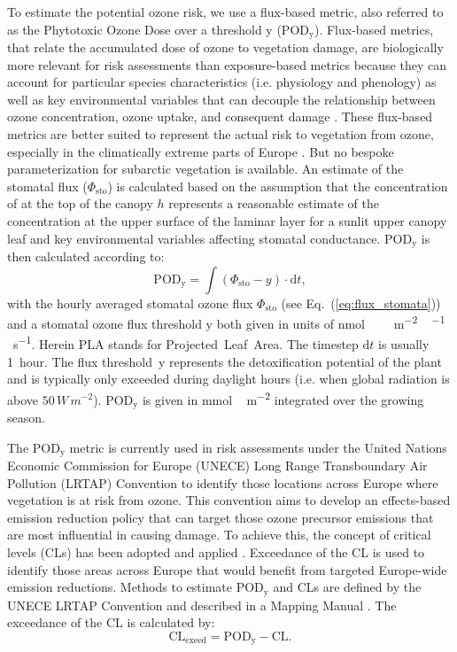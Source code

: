 \documentclass[bg, manuscript]{copernicus}
\begin{document}
To estimate the potential ozone risk, we use a flux-based metric, also referred to as the Phytotoxic Ozone Dose over a threshold y ($\mathrm{POD_y}$). Flux-based metrics, that relate the accumulated dose of ozone to vegetation damage, are biologically more relevant for risk assessments than exposure-based metrics because they can account for particular species characteristics (i.e. physiology and phenology) as well as key environmental variables that can decouple the relationship between ozone concentration, ozone uptake, and consequent damage \citep{PT:Emberson2020}. These flux-based metrics are better suited to represent the actual risk to vegetation from ozone, especially in the climatically extreme parts of Europe \citep{EP:Simpson2007,GCB:Mills2011,ICP:MappingManual2017}. But no bespoke parameterization for subarctic vegetation is available.
An estimate of the stomatal  flux ($\Phi_\mathrm{sto}$) is calculated based on the assumption that the concentration of  at the top of the canopy $h$ represents a reasonable estimate of the concentration at the upper surface of the laminar layer for a sunlit upper canopy leaf and key environmental variables affecting stomatal conductance. $\mathrm{POD_y}$ is then calculated according to:
%
\begin{equation}
  \mathrm{POD_y} = \int{(\Phi_\mathrm{sto}-y)\cdot \mathrm{d}t},
  \label{eq:pod}
\end{equation}
%
with the hourly averaged stomatal ozone flux $\Phi_\mathrm{sto}$ (see Eq.~(\ref{eq:flux_stomata})) and a stomatal ozone flux threshold $\mathrm{y}$ both given in units of \unit{nmol\,\,m^{-2}\,^{-1}\,s^{-1}}. Herein PLA stands for Projected~Leaf~Area. The timestep $\mathrm{d}t$ is usually 1~hour. The flux threshold~$\mathrm{y}$ represents the detoxification potential of the plant and is typically only exceeded during daylight hours (i.e. when global radiation is above $50\,\unit{W\,m^{-2}}$). $\mathrm{POD_y}$ is given in \unit{mmol\,m^{-2}} integrated over the growing season.

The $\mathrm{POD_y}$ metric is currently used in risk assessments under the United Nations Economic Commission for Europe (UNECE) Long Range Transboundary Air Pollution (LRTAP) Convention to identify those locations across Europe where vegetation is at risk from ozone. This convention aims to develop an effects-based emission reduction policy that can target those ozone precursor emissions that are most influential in causing damage. To achieve this, the concept of critical levels (CLs) has been adopted and applied \citep{Maas2016}. Exceedance of the CL is used to identify those areas across Europe that would benefit from targeted Europe-wide emission reductions. Methods to estimate $\mathrm{POD_y}$ and CLs are defined by the UNECE LRTAP Convention and described in a Mapping Manual \citep[most recent version]{ICP:MappingManual2017}. The exceedance of the CL is calculated by: 
%
\begin{equation}
  \mathrm{CL_{exeed}} = \mathrm{POD_y} - \mathrm{CL}.
\end{equation}
%
\end{document}
